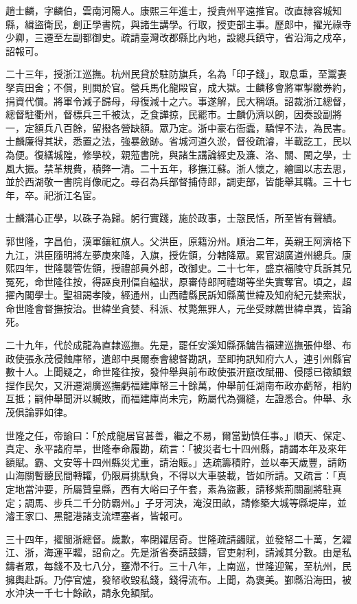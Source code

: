 \begin{pinyinscope}
趙士麟，字麟伯，雲南河陽人。康熙三年進士，授貴州平遠推官。改直隸容城知縣，緝盜衛民，創正學書院，與諸生講學。行取，授吏部主事。歷郎中，擢光祿寺少卿，三遷至左副都御史。疏請臺灣改郡縣比內地，設總兵鎮守，省沿海之戍卒，詔報可。

二十三年，授浙江巡撫。杭州民貸於駐防旗兵，名為「印子錢」，取息重，至鬻妻孥賣田舍；不償，則閧於官。營兵馬化龍毆官，成大獄。士麟移會將軍掣繳券約，捐資代償。將軍令減子歸母，母復減十之六。事遂解，民大稱頌。詔裁浙江總督，總督駐衢州，督標兵三千被汰，乏食譁掠，民罷市。士麟仍濟以餉，因奏設副將一，定額兵八百餘，留撥各營缺額。眾乃定。浙中豪右衙蠹，驕悍不法，為民害。士麟廉得其狀，悉置之法，強暴斂跡。省城河道久淤，督役疏濬，半載訖工，民以為便。復繕城隍，修學校，親蒞書院，與諸生講論經史及濂、洛、關、閩之學，士風大振。禁革規費，積弊一清。二十五年，移撫江蘇。浙人懷之，繪圖以志去思，並於西湖敬一書院肖像祀之。尋召為兵部督捕侍郎，調吏部，皆能舉其職。三十七年，卒。祀浙江名宦。

士麟潛心正學，以硃子為歸。躬行實踐，施於政事，士愨民恬，所至皆有聲績。

郭世隆，字昌伯，漢軍鑲紅旗人。父洪臣，原籍汾州。順治二年，英親王阿濟格下九江，洪臣隨明將左夢庚來降，入旗，授佐領，分轄降眾。累官湖廣道州總兵。康熙四年，世隆襲管佐領，授禮部員外郎，改御史。二十七年，盛京福陵守兵訴其兄冤死，命世隆往按，得誣良刑偪自縊狀，原審侍郎阿禮瑚等坐失實奪官。頃之，超擢內閣學士。聖祖謁孝陵，經通州，山西禮縣民訴知縣萬世緯及知府紀元婪索狀，命世隆會督撫按治。世緯坐貪婪、科派、杖斃無罪人，元坐受賕薦世緯卓異，皆論死。

二十九年，代於成龍為直隸巡撫。先是，罷任安溪知縣孫鏞告福建巡撫張仲舉、布政使張永茂侵蝕庫帑，遣郎中吳爾泰會總督勘訊，至即拘訊知府六人，連引州縣官數十人。上聞疑之，命世隆往按，發仲舉與前布政使張汧竄改賦冊、侵隱已徵額銀捏作民欠，又汧遷湖廣巡撫虧福建庫帑三十餘萬，仲舉前任湖南布政亦虧帑，相約互抵；嗣仲舉聞汧以贓敗，而福建庫尚未完，飭屬代為彌縫，左證悉合。仲舉、永茂俱論罪如律。

世隆之任，帝諭曰：「於成龍居官甚善，繼之不易，爾當勤慎任事。」順天、保定、真定、永平諸府旱，世隆奉命履勘，疏言：「被災者七十四州縣，請蠲本年及來年額賦。霸、文安等十四州縣災尤重，請治賑。」迭疏籌積貯，並以奉天歲豐，請飭山海關暫聽民間轉糶，仍限肩挑馱負，不得以大車裝載，皆如所請。又疏言：「真定地當沖要，所屬贊皇縣，西有大峪曰子午套，素為盜藪，請移紫荊關副將駐真定；調馬、步兵二千分防霸州。」子牙河決，淹沒田畝，請修築大城等縣堤岸，並濬王家口、黑龍港諸支流堙塞者，皆報可。

三十四年，擢閩浙總督。歲歉，率閉糴居奇。世隆疏請蠲賦，並發帑二十萬，乞糴江、浙，海運平糶，詔俞之。先是浙省奏請鼓鑄，官吏射利，請減其分數。由是私鑄者眾，每錢不及七八分，壅滯不行。三十八年，上南巡，世隆迎駕，至杭州，民擁輿赴訴。乃停官爐，發帑收毀私錢，錢得流布。上聞，為褒美。鄞縣沿海田，被水沖決一千七十餘畝，請永免額賦。


\end{pinyinscope}
